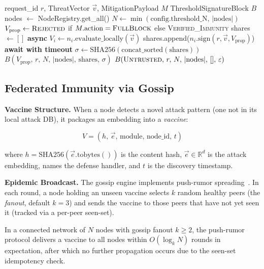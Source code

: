 \documentclass[sigconf,natbib=false]{acmart}
\begin{document}
\begin{algorithm}[t]
\caption{ThresholdValidator.validate($r$, $\vec{v}$, $M$)}
\label{alg:threshold}
\begin{algorithmic}[1]
\Require request\_id $r$, ThreatVector $\vec{v}$, MitigationPayload $M$
\Ensure ThresholdSignatureBlock $B$
\State nodes $\gets$ NodeRegistry.get\_all()
\State $N \gets \min(\text{config.threshold\_N},\, |\text{nodes}|)$
\State $V_\text{prop} \gets \textsc{Rejected}$ if $M.\text{action} = \textsc{FullBlock}$ else \textsc{Verified\_Immunity}
\State shares $\gets []$
 \textbf{async}
  \State $V_i \gets n_i.\text{evaluate\_locally}(\vec{v})$
    \State shares.append($n_i.\text{sign}(r, \vec{v}, V_\text{prop})$)
  \EndIf
\EndFor
\State \textbf{await with timeout}
  \State $\sigma \gets \text{SHA256}(\text{concat\_sorted}(\text{shares}))$
  \Return $B(V_\text{prop},\, r,\, N,\, |\text{nodes}|,\, \text{shares},\, \sigma)$
\Else
  \Return $B(\textsc{Untrusted},\, r,\, N,\, |\text{nodes}|,\, [],\, \varepsilon)$
\EndIf
\end{algorithmic}
\end{algorithm}

\subsection{Federated Immunity via Gossip}
\label{sec:gossip}

\textbf{Vaccine Structure.}
When a node detects a novel attack pattern (one not in its local attack DB),
it packages an embedding into a \emph{vaccine}:

\begin{equation}
\label{eq:vaccine}
V = (h,\, \vec{e},\, \text{module},\, \text{node\_id},\, t)
\end{equation}

where $h = \text{SHA256}(\vec{e}.\text{tobytes}())$ is the content hash,
$\vec{e} \in \mathbb{R}^d$ is the attack embedding,
 names the defense handler, and $t$ is the discovery timestamp.

\textbf{Epidemic Broadcast.}
The gossip engine implements push-rumor spreading~\cite{demers1987epidemic}.
In each round, a node holding an unseen vaccine selects $k$ random healthy
peers (the \emph{fanout}, default $k=3$) and sends the vaccine to those
peers that have not yet seen it (tracked via a per-peer seen-set).

\begin{theorem}
\label{thm:gossip}
In a connected network of $N$ nodes with gossip fanout $k \geq 2$, the
push-rumor protocol delivers a vaccine to all nodes within
$O(\log_k N)$ rounds in expectation, after which no further propagation
occurs due to the seen-set idempotency check.
\end{theorem}
\end{document}
